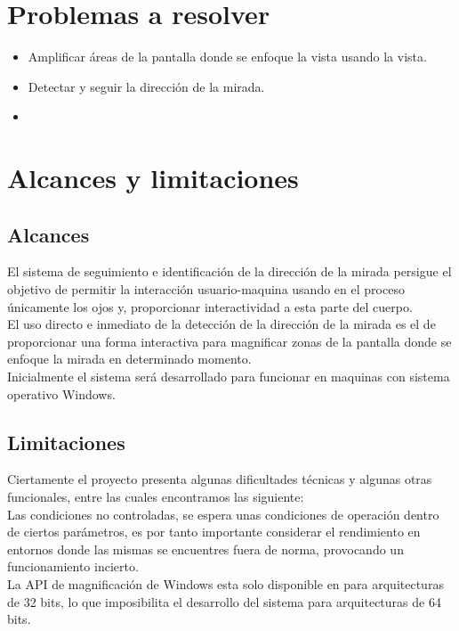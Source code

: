 \documentclass[12pt]{book} %
\begin{document}
\newpage
\section{Problemas a resolver}
	\begin{itemize}
		\item Amplificar áreas de la pantalla donde se enfoque la vista usando la vista.
		\item Detectar y seguir la dirección de la mirada.
		\item 
	\end{itemize}
\newpage
\section{Alcances y limitaciones}
	\subsection{Alcances}
		El sistema de seguimiento e identificación de la dirección de la mirada persigue el objetivo de permitir la interacción 
		usuario-maquina usando en el proceso únicamente los ojos y, proporcionar interactividad a esta parte del cuerpo.\\
		
		El uso directo e inmediato de la detección de la dirección de la mirada es el de proporcionar una forma interactiva 
		para magnificar zonas de la pantalla donde se enfoque la mirada en determinado momento.\\
		
		Inicialmente el sistema será desarrollado para funcionar en maquinas con sistema operativo Windows.\\
		
	\subsection{Limitaciones}
		Ciertamente el proyecto presenta algunas dificultades técnicas y algunas otras funcionales, entre las cuales encontramos
		las siguiente:\\
		
		Las condiciones no controladas, se espera unas condiciones de operación dentro de ciertos parámetros, es por tanto 
		importante considerar el rendimiento en entornos donde las mismas se encuentres fuera de norma, provocando un 
		funcionamiento incierto.\\
		
		La API de magnificación de Windows esta solo disponible en para arquitecturas de 32 bits, lo que imposibilita el desarrollo
		del sistema para arquitecturas de 64 bits.
		
\end{document}

